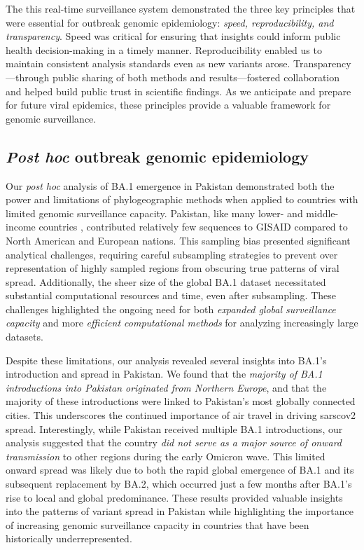 The this real-time surveillance system demonstrated the three key principles that were essential for outbreak genomic epidemiology: \textit{speed, reproducibility, and transparency}.
Speed was critical for ensuring that insights could inform public health decision-making in a timely manner.
Reproducibility enabled us to maintain consistent analysis standards even as new variants arose.
Transparency---through public sharing of both methods and results---fostered collaboration and helped build public trust in scientific findings.
As we anticipate and prepare for future viral epidemics, these principles provide a valuable framework for genomic surveillance.

\subsection{\textit{Post hoc} outbreak genomic epidemiology}
Our \textit{post hoc} analysis of BA.1 emergence in Pakistan demonstrated both the power and limitations of phylogeographic methods when applied to countries with limited genomic surveillance capacity.
Pakistan, like many lower- and middle-income countries \citep{brito2022global}, contributed relatively few sequences to GISAID compared to North American and European nations.
This sampling bias presented significant analytical challenges, requiring careful subsampling strategies to prevent over representation of highly sampled regions from obscuring true patterns of viral spread.
Additionally, the sheer size of the global BA.1 dataset necessitated substantial computational resources and time, even after subsampling.
These challenges highlighted the ongoing need for both \textit{expanded global surveillance capacity} and more \textit{efficient computational methods} for analyzing increasingly large datasets.

Despite these limitations, our analysis revealed several insights into BA.1's introduction and spread in Pakistan.
We found that the \textit{majority of BA.1 introductions into Pakistan originated from Northern Europe}, and that the majority of these introductions were linked to Pakistan's most globally connected cities.
This underscores the continued importance of air travel in driving \gls{sarscov2} spread.
Interestingly, while Pakistan received multiple BA.1 introductions, our analysis suggested that the country \textit{did not serve as a major source of onward transmission} to other regions during the early Omicron wave.
This limited onward spread was likely due to both the rapid global emergence of BA.1 and its subsequent replacement by BA.2, which occurred just a few months after BA.1's rise to local and global predominance.
These results provided valuable insights into the patterns of variant spread in Pakistan while highlighting the importance of increasing genomic surveillance capacity in countries that have been historically underrepresented.

